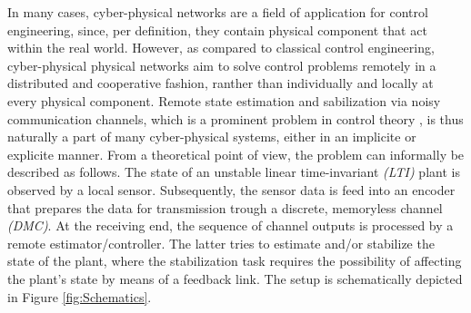 \documentclass[conference]{IEEEtran}
\begin{document}
	In many cases, cyber-physical networks are a field of application for control engineering, since, per definition, they contain physical component that act within the real world. 
	However, as compared to classical control engineering, cyber-physical physical networks aim to solve control problems remotely in a distributed and cooperative fashion, 
	ranther than individually and locally at every physical component. Remote state estimation and sabilization via noisy communication channels, which is a prominent problem 
	in control theory \cite{MS07, MS07SC, S06, SP03}, is thus naturally a part of many cyber-physical systems, either in an implicite or explicite manner. 
	From a theoretical point of view, the problem can informally be described as follows. The state of an unstable linear time-invariant \emph{(LTI)} plant is observed by a local sensor. 
	Subsequently, the sensor data is feed into an encoder that prepares the data for transmission trough a discrete, memoryless channel \emph{(DMC)}. 
	At the receiving end, the sequence of channel outputs is processed by a remote estimator/controller. The latter tries to estimate and/or stabilize the state of the plant, where 
	the stabilization task requires the possibility of affecting the plant's state by means of a feedback link. The setup is schematically depicted in Figure \ref{fig:Schematics}.
\end{document}

